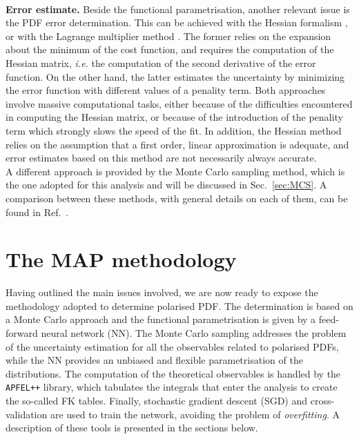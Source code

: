 \endgroup
\\[10pt]
\begingroup
\textbf{Error estimate.} Beside the functional parametrisation, another relevant issue is the PDF error determination. This can be achieved with the Hessian formalism \cite{Pumplin:2001ct}, or with the Lagrange multiplier method \cite{Stump:2001gu}. The former relies on the expansion about the minimum of the cost function, and requires the computation of the Hessian matrix, \textit{i.e.} the computation of the second derivative of the error function. On the other hand, the latter estimates the uncertainty by minimizing the error function with different values of a penality term. Both approaches involve massive computational tasks, either because of the difficulties encountered in computing the Hessian matrix, or because of the introduction of the penality term which strongly slows the speed of the fit. In addition, the Hessian method relies on the assumption that a first order, linear approximation is adequate, and error estimates based on this method are not necessarily always accurate.
\\[6pt]
A different approach is provided by the Monte Carlo sampling method, which is the one adopted for this analysis and will be discussed in Sec.~\ref{sec:MCS}. A comparison between these methods, with general details on each of them, can be found in Ref.~\cite{Forte:2010dt}.
\endgroup
\\[10pt]

\section{The MAP methodology}
\label{sec:MAP}
Having outlined the main issues involved, we are now ready to expose the methodology adopted to determine polarised PDF. The determination is based on a Monte Carlo approach and the functional parametrisation is given by a feed-forward neural network (NN). The Monte Carlo sampling addresses the problem of the uncertainty estimation for all the observables related to polarised PDFs, while the NN provides an unbiased and flexible parametrisation of the distributions. The computation of the theoretical observables is handled by the \texttt{APFEL++} library, which tabulates the integrals that enter the analysis to create the so-called FK tables. Finally, stochastic gradient descent (SGD) and cross-validation are used to train the network, avoiding the problem of \textit{overfitting}. A description of these tools is presented in the sections below.


